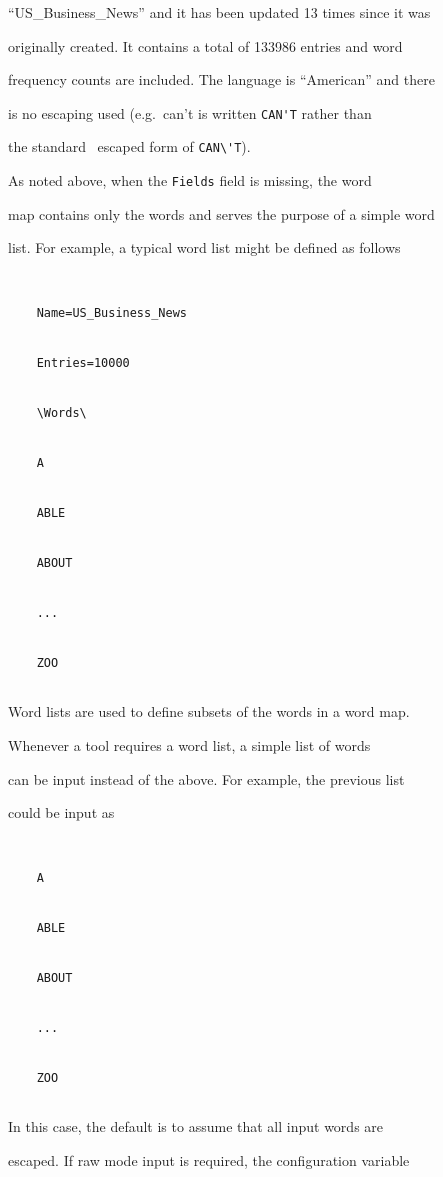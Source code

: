 ``US\_Business\_News'' and it has been updated 13 times since it was


originally created.  It contains a total of 133986 entries and word


frequency counts are included.  The language is ``American'' and there


is no escaping used (e.g.\ can't is written \verb+CAN'T+ rather than


the standard \HTK\ escaped form of \verb+CAN\'T+).





As noted above, when the \texttt{Fields} field is missing, the word


map contains only the words and serves the purpose of a simple word


list.  For example, a typical word list might be defined as follows


\begin{verbatim}


    Name=US_Business_News


    Entries=10000


    \Words\


    A


    ABLE


    ABOUT


    ...


    ZOO  


\end{verbatim}


Word lists are used to define subsets of the words in a word map.


Whenever a tool requires a word list, a simple list of words


can be input instead of the above.  For example, the previous list


could be input as


\begin{verbatim}


    A


    ABLE


    ABOUT


    ...


    ZOO  


\end{verbatim}


In this case, the default is to assume that all input words are


escaped.  If raw mode input is required, the configuration variable


